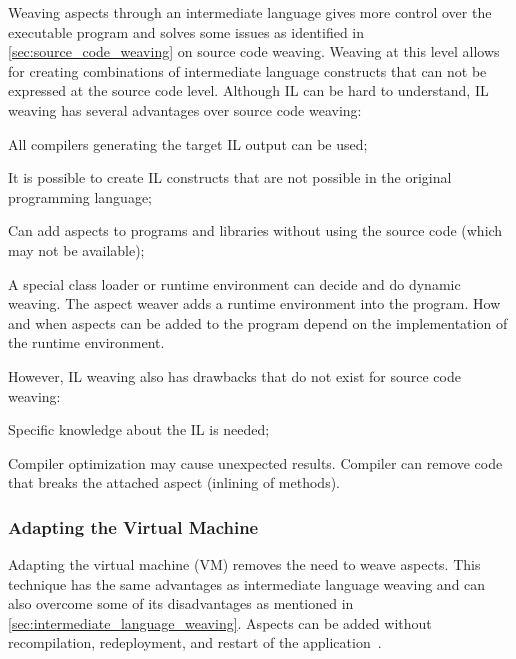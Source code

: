 Weaving aspects through an intermediate language gives more control over the executable program and solves some issues as identified in \autoref{sec:source_code_weaving} on source code weaving.
Weaving at this level allows for creating combinations of intermediate language constructs that can not be expressed at the source code level.
Although IL can be hard to understand, IL weaving has several advantages over source code weaving:
\begin{description}[style=nextline,noitemsep]
  \item[Programming language independence] All compilers generating the target IL output can be used;
  \item[More expressiveness] It is possible to create IL constructs that are not possible in the original programming language;
  \item[Source code independence] Can add aspects to programs and libraries without using the source code (which may not be available);
  \item[Adding aspects at load- or runtime] A special class loader or runtime environment can decide and do dynamic weaving.
       The aspect weaver adds a runtime environment into the program.
       How and when aspects can be added to the program depend on the implementation of the runtime environment.
\end{description}

However, IL weaving also has drawbacks that do not exist for source code weaving:
\begin{description}[style=nextline,noitemsep]
  \item[Hard to understand] Specific knowledge about the IL is needed;
  \item[More error-prone] Compiler optimization may cause unexpected results.
       Compiler can remove code that breaks the attached aspect (\eg inlining of methods).
\end{description}

\subsubsection{Adapting the Virtual Machine}

%
Adapting the virtual machine (VM) removes the need to weave aspects.
This technique has the same advantages as intermediate language weaving and can also overcome some of its disadvantages as mentioned in \autoref{sec:intermediate_language_weaving}.
Aspects can be added without recompilation, redeployment, and restart of the application~\cite{popovici:aosd02,popovici:aosd03}.

